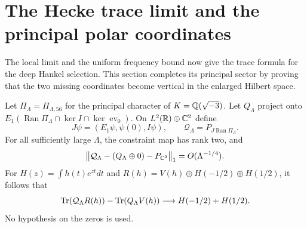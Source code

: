 \section{The Hecke trace limit and the principal polar coordinates}
\label{sec:hecke-assembly}
The local limit and the uniform frequency bound now give the trace
formula for the deep Hankel selection. This section completes its
principal sector by proving that the two missing coordinates become
vertical in the enlarged Hilbert space.

\begin{proposition}
\label{prop:hecke-principal-graph}
Let $\Pi_\Lambda=\Pi_{\Lambda,56}$ for the principal character of
$K=\mathbb Q(\sqrt{-3})$. Let $Q_\Lambda$ project onto
$E_1(\operatorname{Ran}\Pi_\Lambda\cap\ker I\cap\ker\operatorname{ev}_0)$.
On $L^2(\mathbb R)\oplus\mathbb C^2$ define
\[
 J\psi=(E_1\psi,\psi(0),I\psi),\qquad
 \mathcal Q_\Lambda=P_{J\operatorname{Ran}\Pi_\Lambda}.
\]
For all sufficiently large $\Lambda$, the constraint map has rank two,
and
\begin{equation}\label{eq:hecke-vertical-graph}
 \bigl\|\mathcal Q_\Lambda-(Q_\Lambda\oplus0)
                         -P_{\mathbb C^2}\bigr\|_1
                         =O(\Lambda^{-1/4}).
\end{equation}
For $H(z)=\int h(t)e^{zt}dt$ and
$R(h)=V(h)\oplus H(-1/2)\oplus H(1/2)$, it follows that
\[
 \operatorname{Tr}(\mathcal Q_\Lambda R(h))-
           \operatorname{Tr}(Q_\Lambda V(h))
                  \longrightarrow H(-1/2)+H(1/2).
\]
No hypothesis on the zeros is used.
\end{proposition}
